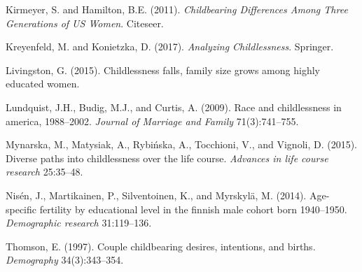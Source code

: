 \documentclass[
  11pt,
  letterpaper,
]{article}
\newlength{\cslhangindent}
\newlength{\cslentryspacingunit} %
\newenvironment{CSLReferences}[2] %
 {%
  \setlength{\parindent}{0pt}
  \ifodd #1
  \let\oldpar\par
  \def\par{\hangindent=\cslhangindent\oldpar}
  \fi
  \setlength{\parskip}{#2\cslentryspacingunit}
 }%
 {}
\begin{document}
\begin{CSLReferences}{1}{0}
\leavevmode{}%
Kirmeyer, S. and Hamilton, B.E. (2011). \emph{Childbearing Differences Among Three Generations of US Women}. Citeseer.

\leavevmode{}%
Kreyenfeld, M. and Konietzka, D. (2017). \emph{Analyzing Childlessness}. Springer.

\leavevmode{}%
Livingston, G. (2015). Childlessness falls, family size grows among highly educated women.

\leavevmode{}%
Lundquist, J.H., Budig, M.J., and Curtis, A. (2009). Race and childlessness in america, 1988--2002. \emph{Journal of Marriage and Family} 71(3):741--755.

\leavevmode{}%
Mynarska, M., Matysiak, A., Rybińska, A., Tocchioni, V., and Vignoli, D. (2015). Diverse paths into childlessness over the life course. \emph{Advances in life course research} 25:35--48.

\leavevmode{}%
Nisén, J., Martikainen, P., Silventoinen, K., and Myrskylä, M. (2014). Age-specific fertility by educational level in the finnish male cohort born 1940--1950. \emph{Demographic research} 31:119--136.

\leavevmode{}%
Thomson, E. (1997). Couple childbearing desires, intentions, and births. \emph{Demography} 34(3):343--354.

\end{CSLReferences}
\end{document}
